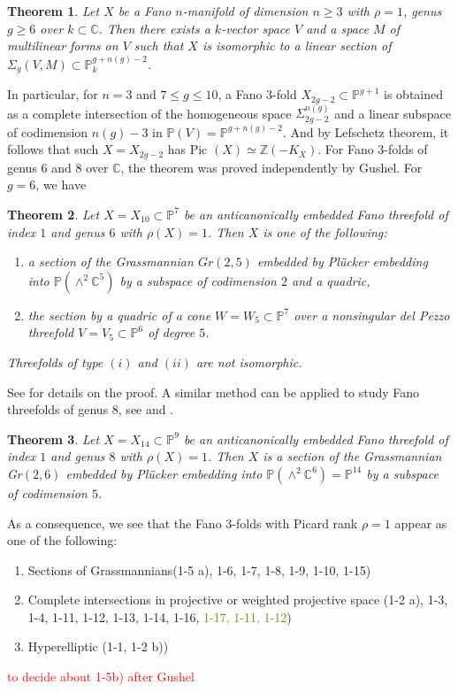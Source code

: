 \documentclass[11pt]{amsart}
\theoremstyle{plain}
\newtheorem{theorem}{Theorem}[section]
\theoremstyle{definition}
\theoremstyle{expl}
\begin{document}
\begin{theorem}
    Let $X$ be a Fano $n$-manifold of dimension $n \geq 3$ with $\rho =1$, genus $g\geq 6$ over $k \subset \mathbb{C}$. Then there exists a $k$-vector space $V$ and a space $M$ of multilinear forms on $V$ such that $X$ is isomorphic to a linear section of $\Sigma_g(V,M) \subset \mathbb{P}^{g+n(g)-2}_k$. 
\end{theorem}
In particular, for $n=3$ and $7 \leq g \leq 10$, a Fano $3$-fold $X_{2g-2} \subset \mathbb{P}^{g+1}$ is obtained as a complete intersection of the homogeneous space $\Sigma_{2g-2}^{n(g)}$ and a linear subspace of codimension $n(g)-3$ in $\mathbb{P}(V) = \mathbb{P}^{g+n(g)-2}$. And by Lefschetz theorem, it follows that such $X=X_{2g-2}$ has Pic $(X) \simeq \mathbb{Z}(-K_X)$.
For Fano $3$-folds of genus $6$ and $8$ over $\mathbb{C}$, the theorem was proved independently by Gushel. For $g=6$, we have  
\begin{theorem}
    Let $X=X_{10} \subset \mathbb{P}^7$ be an anticanonically embedded Fano threefold of index $1$ and genus $6$ with $\rho(X)=1$. Then $X$ is one of the following:
    \begin{enumerate}
        \item[(i)] a section of the Grassmannian $Gr(2,5)$ embedded by Pl\"{u}cker embedding into $\mathbb{P}(\wedge^2 \mathbb{C}^5)$ by a subspace of codimension $2$ and a quadric,
        \item[(ii)] the section by a quadric of a cone $W=W_5 \subset\mathbb{P}^7$ over a nonsingular del Pezzo threefold $V= V_5 \subset \mathbb{P}^6$ of degree $5$.
    \end{enumerate}
    Threefolds of type $(i)$ and $(ii)$ are not isomorphic.
\end{theorem}
See \cite{Gus6} for details on the proof.
A similar method can be applied to study Fano threefolds of genus $8$, see \cite{Gus83} and \cite{Gus92}. 
\begin{theorem}
    Let $X=X_{14} \subset \mathbb{P}^9$ be an anticanonically embedded Fano threefold of index $1$ and genus $8$ with $\rho(X)=1$. Then $X$ is a section of the Grassmannian Gr$(2,6)$ embedded by Pl\"{u}cker embedding into $\mathbb{P}(\wedge^2 \mathbb{C}^6) = \mathbb{P}^{14}$ by a subspace of codimension $5$.
\end{theorem}

As a consequence, we see that the Fano $3$-folds with Picard rank $\rho =1$ appear as one of the following: 
\begin{enumerate}
    \item[(i)] Sections of Grassmannians(1-5 a), 1-6, 1-7, 1-8, 1-9, 1-10, 1-15)
    \item[(ii)] Complete intersections in projective or weighted projective space (1-2 a), 1-3, 1-4, 1-11, 1-12, 1-13, 1-14, 1-16, \textcolor{olive}{1-17, 1-11, 1-12})
    \item[(iii)] Hyperelliptic (1-1, 1-2 b))
\end{enumerate}
\textcolor{red}{to decide about 1-5b) after Gushel}
	
\end{document}
